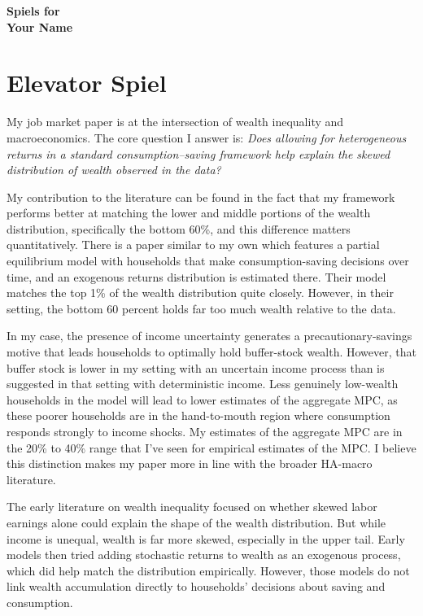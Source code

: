 \documentclass[11pt]{article}
\begin{document}
\begin{center}
{\Large {\bf Spiels for }}
\\[5pt]
{\large {\bf Your Name}}
\end{center}

\vspace{.3cm}

\section{\large Elevator Spiel} %


\noindent
My job market paper is at the intersection of wealth inequality and macroeconomics. The core question I answer is: \textit{Does allowing for heterogeneous returns in a standard consumption–saving framework help explain the skewed distribution of wealth observed in the data?}


\vspace{0.5em}
\noindent
My contribution to the literature can be found in the fact that my framework performs better at matching the lower and middle portions of the wealth distribution, specifically the bottom 60\%, and this difference matters quantitatively. There is a paper similar to my own which features a partial equilibrium model with households that make consumption-saving decisions over time, and an exogenous returns distribution is estimated there. Their model matches the top 1\% of the wealth distribution quite closely. However, in their setting, the bottom 60 percent holds far too much wealth relative to the data.

In my case, the presence of income uncertainty generates a precautionary-savings motive that leads households to optimally hold buffer-stock wealth. However, that buffer stock is lower in my setting with an uncertain income process than is suggested in that setting with deterministic income. Less genuinely low-wealth households in the model will lead to lower estimates of the aggregate MPC, as these poorer households are in the hand-to-mouth region where consumption responds strongly to income shocks. My estimates of the aggregate MPC are in the 20\% to 40\% range that I've seen for empirical estimates of the MPC. I believe this distinction makes my paper more in line with the broader HA-macro literature.


\vspace{0.5em}
\noindent
The early literature on wealth inequality focused on whether skewed labor earnings alone could explain the shape of the wealth distribution. But while income is unequal, wealth is far more skewed, especially in the upper tail. Early models then tried adding stochastic returns to wealth as an exogenous process, which did help match the distribution empirically. However, those models do not link wealth accumulation directly to households’ decisions about saving and consumption.
\end{document}
